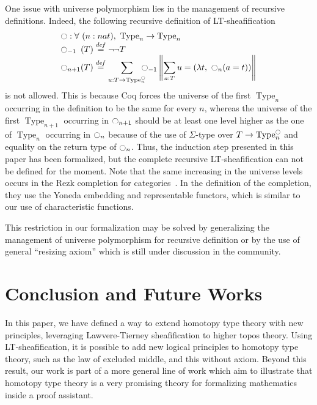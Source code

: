 \documentclass[preprint,9pt,numbers]{sigplanconf}
\newcommand \defeq {\overset{de\hspace{-0.2ex}f}{=}}
\newcommand{\mynote}[2]{
    \fbox{\bfseries\sffamily\scriptsize#1}
    {\small$\blacktriangleright$\textsf{\emph{#2}}$\blacktriangleleft$}~}
\newcommand\nt[1]{\mynote{NT}{#1}}
\DeclareMathOperator{\Type}{Type}
\newcommand{\modal}{\ensuremath{\ocircle}}
\begin{document}
One issue with universe polymorphism lies in the management of
recursive definitions. Indeed, the following recursive definition of
LT-sheafification
%
\[ \begin{array}{l}
   \modal : \forall \ (n : nat), \ \Type_n \to \Type_n 
   \\
    \modal_{-1\phantom{n}}(T) \defeq\lnot\lnot T \\

      \displaystyle{\modal_{n+1}(T)} \defeq  
      \displaystyle{\sum_{u:T \to \Type_n^\modal} \!\!\!\!\modal_{-1} 
      \left\|
      \sum_{a:T} u= (\lambda t,~\modal_n (a=t))
      \right\|}
    \end{array}
\]
%
is not allowed. 
%
This is because Coq forces the universe of the first $\Type_n$
occurring in the definition to be the same for every $n$, whereas the
universe of the first $\Type_{n+1}$ occurring in $\modal_{n+1}$ should be at
least one level higher as the one of $\Type_n$ occurring in
$\modal_{n}$ because of the use of $\Sigma$-type over
$T \to \Type_n^\modal$ and equality on the return type of $\modal_n$.
%
%
Thus, the induction step presented in this paper has been formalized,
but the complete recursive LT-sheafification can not be defined for the
moment.
%
Note that the same increasing in the universe levels occurs in the
Rezk completion for categories~\cite{rezk}. In the definition of the
completion, they use the Yoneda embedding and representable functors,
which is similar to our use of characteristic functions.
 
%
This restriction in our formalization may be solved by
generalizing the management of universe polymorphism for recursive definition
%
or by the use of general ``resizing axiom'' which is still under
discussion in the community.

\section{Conclusion and Future Works}
\label{sec:future-works}

In this paper, we have defined a way to extend homotopy type theory
with new principles, leveraging Lawvere-Tierney sheafification to
higher topos theory. 
%
Using LT-sheafification, it is possible to add new logical principles to
homotopy type theory, such as the law of excluded middle, and this
without axiom.
%
Beyond this result, our work is part of a more general line of work
which aim to illustrate that homotopy type theory is a very promising
theory for formalizing mathematics inside a proof assistant.
\end{document}
